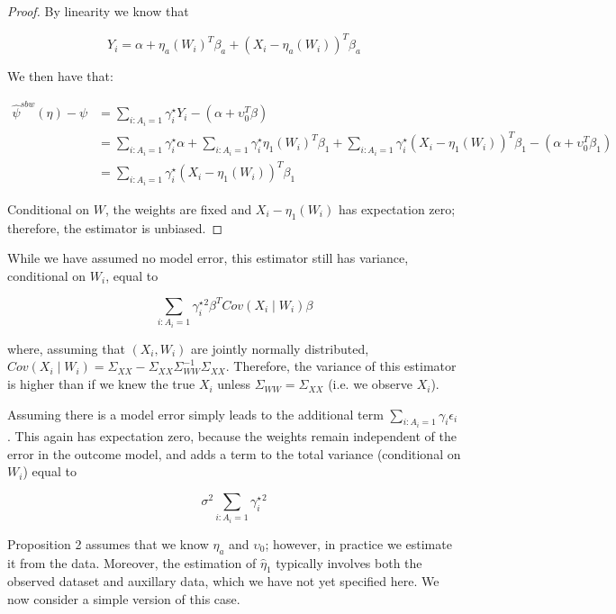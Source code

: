 \begin{proof}

By linearity we know that

$$
Y_i = \alpha + \eta_a(W_i)^T\beta_a + (X_i - \eta_a(W_i))^T\beta_a
$$

We then have that:

\begin{align*}
    \hat{\psi}^{sbw}(\eta) - \psi &= \sum_{i: A_i = 1}\gamma_i^\star Y_i - (\alpha + \upsilon_0^T\beta) \\
    &= \sum_{i: A_i = 1}\gamma_i^\star\alpha + \sum_{i: A_i = 1}\gamma_i^\star\eta_1(W_i)^T\beta_1 + \sum_{i: A_i = 1}\gamma_i^\star(X_i - \eta_1(W_i))^T\beta_1 - (\alpha + \upsilon_0^T\beta_1) \\
    &= \sum_{i: A_i = 1}\gamma_i^\star(X_i - \eta_1(W_i))^T\beta_1
\end{align*}

Conditional on $W$, the weights are fixed and $X_i - \eta_1(W_i)$ has expectation zero; therefore, the estimator is unbiased.

\end{proof}
\begin{remark}

While we have assumed no model error, this estimator still has variance, conditional on $W_i$, equal to

$$
\sum_{i: A_i = 1} \gamma_i^\star^2\beta^TCov(X_i \mid W_i)\beta
$$

where, assuming that $(X_i, W_i)$ are jointly normally distributed, $Cov(X_i \mid W_i) = \Sigma_{XX} - \Sigma_{XX}\Sigma_{WW}^{-1}\Sigma_{XX}$. Therefore, the variance of this estimator is higher than if we knew the true $X_i$ unless $\Sigma_{WW} = \Sigma_{XX}$ (i.e. we observe $X_i$). 

\end{remark}

\begin{remark}
Assuming there is a model error simply leads to the additional term $\sum_{i: A_i = 1}\gamma_i\epsilon_i$. This again has expectation zero, because the weights remain independent of the error in the outcome model, and adds a term to the total variance (conditional on $W_i$) equal to

$$
\sigma^2\sum_{i: A_i = 1}\gamma_i^\star^2
$$
\end{remark}

Proposition 2 assumes that we know $\eta_a$ and $\upsilon_0$; however, in practice we estimate it from the data. Moreover, the estimation of $\hat{\eta}_1$ typically involves both the observed dataset and auxillary data, which we have not yet specified here. We now consider a simple version of this case.

